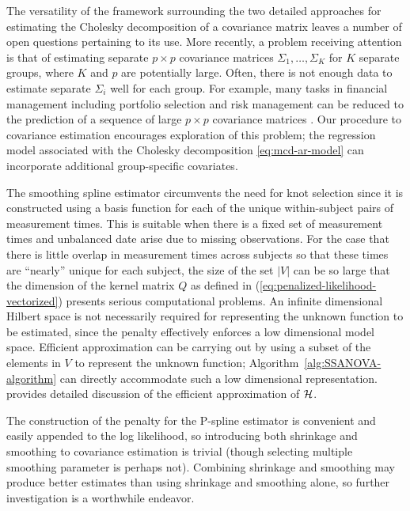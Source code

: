\bigskip 


The versatility of the framework surrounding the two detailed approaches for estimating the Cholesky decomposition of a covariance matrix leaves a number of open questions pertaining to its use. More recently, a problem receiving attention is that of estimating separate $p\times p$ covariance matrices $\Sigma_1,\dots, \Sigma_K$ for $K$ separate groups, where $K$ and $p$ are potentially large. Often, there is not enough data to estimate separate $\Sigma_i$ well for each group. For example, many tasks in financial management including portfolio selection and risk management can be reduced to the prediction of a sequence of large $p \times p$ covariance matrices \citep{tsay2005analysis}. Our procedure to covariance estimation encourages exploration of this problem; the regression model associated with the Cholesky decomposition \eqref{eq:mcd-ar-model} can incorporate additional group-specific covariates. 

\bigskip

The smoothing spline estimator circumvents the need for knot selection since it is constructed using a basis function for each of the unique within-subject pairs of measurement times. This is suitable when there is a fixed set of measurement times and unbalanced date arise due to missing observations. For the case that there is little overlap in measurement times across subjects so that these times are ``nearly'' unique for each subject, the size of the set $\vert V \vert $ can be so large that the dimension of the kernel matrix $Q$ as defined in (\ref{eq:penalized-likelihood-vectorized}) presents serious computational problems. An infinite dimensional Hilbert space is not necessarily required for representing the unknown function to be estimated, since the penalty effectively enforces a low dimensional model space. Efficient approximation can be carrying out by using a subset of the elements in $V$ to represent the unknown function; Algorithm~\ref{alg:SSANOVA-algorithm} can directly accommodate such a low dimensional representation. \cite{kim2004smoothing} provides detailed discussion of the efficient approximation of $\mathcal{H}$.

\bigskip

The construction of the penalty for the P-spline estimator is convenient and easily appended to the log likelihood, so introducing both shrinkage and smoothing to covariance estimation is trivial (though selecting multiple smoothing parameter is perhaps not). Combining shrinkage and smoothing may produce better estimates than using shrinkage and smoothing alone, so further investigation is a worthwhile endeavor. 

